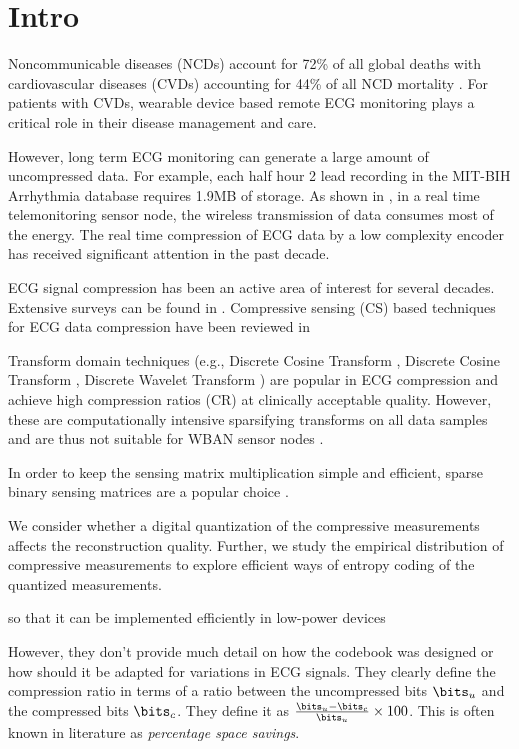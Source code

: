 \section{Intro}
Noncommunicable diseases (NCDs) account for 72\%
of all global deaths with cardiovascular diseases
(CVDs) accounting for 44\% of all NCD mortality
\cite{collins2019interact}.
For patients with CVDs, wearable device based remote ECG
monitoring plays a critical role in their disease
management and care. 


However, long term ECG monitoring
can generate a large amount of uncompressed data.
For example, each half hour 2 lead recording in the
MIT-BIH Arrhythmia database \cite{moody2001impact}
requires 1.9MB of storage. As shown in \cite{mamaghanian2011compressed},
in a real time telemonitoring sensor node, the wireless
transmission of data consumes most of the energy.
The real time compression of ECG data by a low
complexity encoder has received significant attention
in the past decade.

ECG signal compression has been an active area
of interest for several decades. Extensive surveys
can be found in \cite{singh2015review,rajankar2019electrocardiogram}.
Compressive sensing (CS) based techniques for ECG
data compression have been reviewed in 

Transform domain techniques
(e.g., Discrete Cosine Transform \cite{al1995dynamic},
Discrete Cosine Transform \cite{batista2001compression,bendifallah2011improved},
Discrete Wavelet Transform \cite{djohan1995ecg,lu2000wavelet,pooyan2004wavelet,kim2006wavelet}) are popular in ECG compression
and achieve high compression ratios (CR) at clinically
acceptable quality.
However, these are computationally intensive sparsifying
transforms on all data samples and are thus not suitable
for WBAN sensor nodes \cite{craven2014compressed}.

In order to keep the sensing matrix multiplication
simple and efficient, sparse binary sensing matrices
are a popular choice \cite{mamaghanian2011compressed,zhang2012compressed}.

We consider whether a digital quantization of the compressive
measurements affects the reconstruction quality.
Further, we study the empirical distribution of compressive
measurements to explore efficient ways of entropy coding
of the quantized measurements.

so that it
can be implemented efficiently in low-power devices


However, they don't
provide much detail on how the codebook was designed or how should
it be adapted for variations in ECG signals.
They clearly define the compression ratio in terms
of a ratio between the uncompressed bits $\bits_u$
and the compressed bits $\bits_c$. They define it
as $\frac{\bits_u - \bits_c}{\bits_u} \times 100$.
This is often known in literature as
\emph{percentage space savings}.

